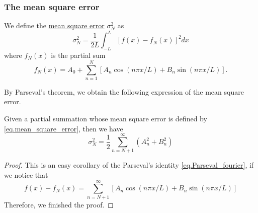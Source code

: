 \subsubsection{The mean square error}

\begin{definition}
We define the \underline{mean square error} $\sigma_N^2$ as
\begin{equation}\label{eq.mean_square_error}
    \sigma_N^2=\frac{1}{2 L} \int_{-L}^L[f(x)-f_N(x)]^2 d x
\end{equation}
where $f_N(x)$ is the partial sum
\begin{equation}
    f_N(x)=A_0+\sum_{n=1}^N\left[A_n \cos (n \pi x / L)+B_n \sin (n \pi x / L)\right] .
\end{equation}
\end{definition}

By Parseval's theorem, we obtain the following expression of the mean square error.

\begin{proposition}[] Given a partial summation whose mean square error is defined by \eqref{eq.mean_square_error}, then we have
    \begin{equation}\label{eq.mean_square_error_Parseval}
        \sigma_N^2=\frac{1}{2} \sum_{n=N+1}^{\infty}\left(A_n^2+B_n^2\right)
    \end{equation}
\end{proposition}
\begin{proof}
    This is an easy corollary of the Parseval's identity \eqref{eq.Parseval_fourier}, if we notice that
    $$
    f(x)-f_N(x) = \sum_{n=N+1}^\infty\left[A_n \cos (n \pi x / L)+B_n \sin (n \pi x / L)\right]
    $$ 
Therefore, we finished the proof.
\end{proof}

